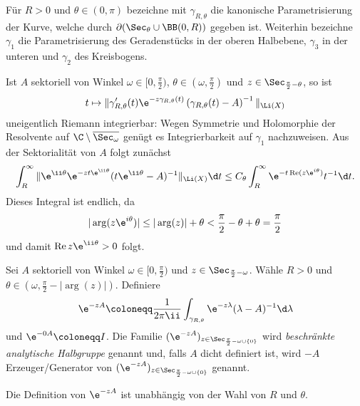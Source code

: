 \begin{ntion}
  Für $R > 0$ und $\theta \in (0,\pi)$ bezeichne mit $\gamma_{R, \theta}$ die kanonische Parametrisierung der Kurve, welche durch $\partial(\Sec_\theta \cup \BB(0,R))$ gegeben ist.
  Weiterhin bezeichne $\gamma_1$ die Parametrisierung des Geradenstücks in der oberen Halbebene, $\gamma_3$ in der unteren und $\gamma_2$ des Kreisbogens.
\end{ntion}

\begin{obs}
  \label{obs:integrablePath}
  Ist $A$ sektoriell von Winkel $\omega \in [0,\frac{\pi}{2} )$, $\theta \in (\omega, \frac{\pi}{2})$ und $z \in \Sec_{\frac{\pi}{2} - \theta}$, so ist 
  $$
  t \mapsto \|\gamma'_{R,\theta}(t) \e^{-z\gamma_{R,\theta}(t)} \left( \gamma_{R, \theta}(t) - A \right)^{-1} \|_{\Li(X)}
  $$
  uneigentlich Riemann integrierbar: 
  Wegen Symmetrie und Holomorphie der Resolvente auf $\C \setminus \overline{\Sec_\omega}$ genügt es Integrierbarkeit auf $\gamma_1$ nachzuweisen.
  Aus der Sektorialität von $A$ folgt zunächst
  $$
    \int_{R}^\infty \| \e^{\ii\theta} \e^{-zt \e^{\ii\theta}} ( t\e^{\ii\theta} - A )^{-1} \|_{\Li(X)} \d t
    \leq C_\theta \int_R^\infty \e^{-t \operatorname{Re}(z \e^{i \theta})} t^{-1} \d t.
  $$
  Dieses Integral ist endlich, da
  $$
  |\arg(z \e^{i \theta})| \leq |\arg(z)| + \theta < \frac{\pi}{2} - \theta + \theta = \frac{\pi}{2}
  $$
  und damit $\operatorname{Re}z \e^{\ii\theta} > 0$ folgt.
\end{obs}

\begin{defn}
  Sei $A$ sektoriell von Winkel $\omega \in [0,\frac{\pi}{2})$ und $z \in \Sec_{\frac{\pi}{2} - \omega}$.
    Wähle $R > 0$ und $\theta \in (\omega, \frac{\pi}{2} - |\arg(z)|)$.
    Definiere
    $$
    \e^{-zA} \coloneqq \frac{1}{2\pi \ii} \int_{\gamma_{R, \theta}} \e^{-z\lambda } (\lambda - A)^{-1} \d \lambda
    $$
    und $\e^{-0A} \coloneqq I$.
    Die Familie $(\e^{-zA})_{z \in \Sec_{\frac{\pi}{2} - \omega \cup \{0\}}}$  wird \emph{beschränkte analytische Halbgruppe} genannt und, falls $A$ dicht definiert ist, wird $-A$ Erzeuger/Generator von $(\e^{-zA})_{z \in \Sec_{\frac{\pi}{2} - \omega \cup \{0\}}}$ genannt.
\end{defn}

\begin{lem}
  \label{lem:welldefinedsg}
  Die Definition von $\e^{-zA}$ ist unabhängig von der Wahl von $R$ und $\theta$.
\end{lem}

